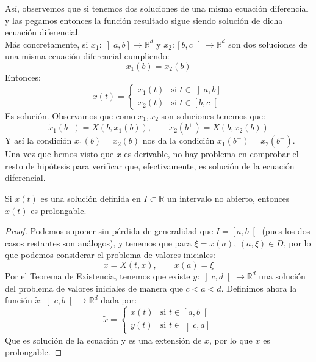 \begin{observacion}
    Así, observemos que si tenemos dos soluciones de una misma ecuación diferencial y las pegamos entonces la función resultado sigue siendo solución de dicha ecuación diferencial.\\

    \noindent
    Más concretamente, si $x_1:\left]a,b\right]\to \mathbb{R}^d$ y $x_2:\left[b,c\right[\to \mathbb{R}^d$ son dos soluciones de una misma ecuación diferencial cumpliendo:
    \begin{equation*}
        x_1(b) = x_2(b)
    \end{equation*}
    Entonces:
    \begin{equation*}
        x(t) = \left\{\begin{array}{ll}
            x_1(t) & \text{si\ } t\in \left]a,b\right] \\
             x_2(t) & \text{si\ } t\in \left[b,c\right[
        \end{array}\right. 
    \end{equation*}
    Es solución. Observamos que como $x_1,x_2$ son soluciones tenemos que:
    \begin{equation*}
        \dot{x}_1(b^-) = X(b,x_1(b)), \qquad \dot{x}_2(b^+) = X(b,x_2(b))
    \end{equation*}
    Y así la condición $x_1(b) = x_2(b)$ nos da la condición $\dot{x}_1(b^-) = \dot{x}_2(b^+)$. Una vez que hemos visto que $x$ es derivable, no hay problema en comprobar el resto de hipótesis para verificar que, efectivamente, es solución de la ecuación diferencial.
\end{observacion}

\begin{lema}\label{lema:prolongable}
    Si $x(t)$ es una solución definida en $I\subset \mathbb{R}$ un intervalo no abierto, entonces $x(t)$ es prolongable.
    \begin{proof}
        Podemos suponer sin pérdida de generalidad que $I =\left[a,b\right[$ (pues los dos casos restantes son análogos), y tenemos que para $\xi = x(a)$, $(a,\xi)\in D$, por lo que podemos considerar el problema de valores iniciales:
        \begin{equation*}
            \dot{x} = X(t,x), \qquad x(a) = \xi
        \end{equation*}
        Por el Teorema de Existencia, tenemos que existe $y:\left]c,d\right[\to \mathbb{R}^d$ una solución del problema de valores iniciales de manera que $c<a<d$. Definimos ahora la función $\tilde{x}:\left]c,b\right[\to \mathbb{R}^d$ dada por:
        \begin{equation*}
            \tilde{x} = \left\{\begin{array}{ll}
                x(t) & \text{si\ } t\in \left[a,b\right[ \\
                 y(t) & \text{si\ } t\in \left]c,a\right]
            \end{array}\right. 
        \end{equation*}
        Que es solución de la ecuación y es una extensión de $x$, por lo que $x$ es prolongable.
    \end{proof}
\end{lema}

